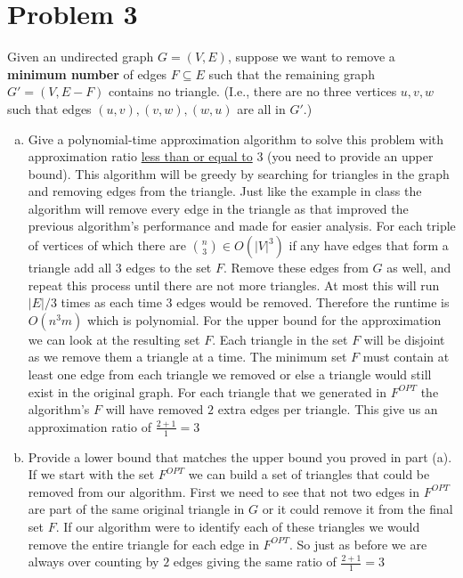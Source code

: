 \documentclass{article}
\begin{document}
\section*{Problem 3}
Given an undirected graph $G=(V,E)$, suppose we want to remove a \textbf{minimum number} of edges $F \subseteq E$ such that the remaining graph $G' = (V,E-F)$ contains no triangle.
(I.e., there are no three vertices $u,v,w$ such that edges $(u,v),(v,w),(w,u)$ are all in $G'$.)
\begin{enumerate}[a.]
\item Give a polynomial-time approximation algorithm to solve this problem with approximation ratio \underline{less than or equal to} 3 (you need to provide an upper bound).
\newline
This algorithm will be greedy by searching for triangles in the graph and removing edges from the triangle.
Just like the example in class the algorithm will remove every edge in the triangle as that improved the previous algorithm's performance and made for easier analysis.
\newline
For each triple of vertices of which there are ${n \choose 3} \in O(|V|^3)$ if any have edges that form a triangle add all $3$ edges to the set $F$.
Remove these edges from $G$ as well, and repeat this process until there are not more triangles.
At most this will run $|E|/3$ times as each time $3$ edges would be removed.
Therefore the runtime is $O(n^3m)$ which is polynomial.
\newline
For the upper bound for the approximation we can look at the resulting set $F$.
Each triangle in the set $F$ will be disjoint as we remove them a triangle at a time.
The minimum set $F$ must contain at least one edge from each triangle we removed or else a triangle would still exist in the original graph.
For each triangle that we generated in $F^{OPT}$ the algorithm's $F$ will have removed $2$ extra edges per triangle.
This give us an approximation ratio of $\frac{2+1}{1} = 3$


\item Provide a lower bound that matches the upper bound you proved in part (a).
\newline
If we start with the set $F^{OPT}$ we can build a set of triangles that could be removed from our algorithm.
First we need to see that not two edges in $F^{OPT}$ are part of the same original triangle in $G$ or it could remove it from the final set $F$.
If our algorithm were to identify each of these triangles we would remove the entire triangle for each edge in $F^{OPT}$.
So just as before we are always over counting by $2$ edges giving the same ratio of $\frac{2+1}{1} = 3$
\end{enumerate}
\end{document}
